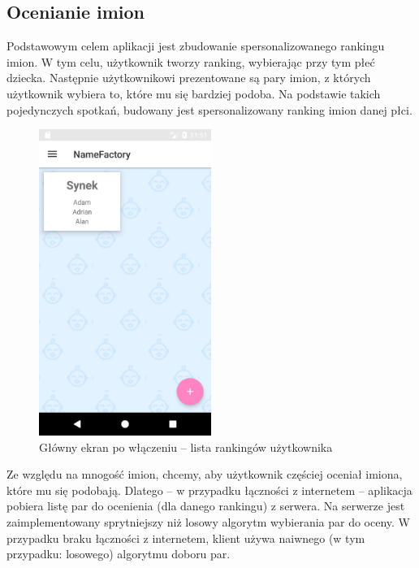 \documentclass[12pt,a4paper]{article}
\begin{document}
\subsection{Ocenianie imion}

Podstawowym celem aplikacji jest zbudowanie spersonalizowanego rankingu imion.
W tym celu, użytkownik tworzy ranking, wybierając przy tym płeć dziecka.
Następnie użytkownikowi prezentowane są pary imion, z których użytkownik wybiera to, które mu się bardziej podoba.
Na podstawie takich pojedynczych spotkań, budowany jest spersonalizowany ranking imion danej płci.

\begin{figure}[h]
    \caption{Główny ekran po włączeniu -- lista rankingów użytkownika}
    \centering
    \includegraphics[width=0.5\textwidth]{rankings}
\end{figure}

Ze względu na mnogość imion, chcemy, aby użytkownik częściej oceniał imiona, które mu się podobają.
Dlatego -- w przypadku łączności z internetem -- aplikacja pobiera listę par do ocenienia (dla danego rankingu) z serwera.
Na serwerze jest zaimplementowany sprytniejszy niż losowy algorytm wybierania par do oceny.
W przypadku braku łączności z internetem, klient używa naiwnego (w tym przypadku: losowego) algorytmu doboru par.
\end{document}
